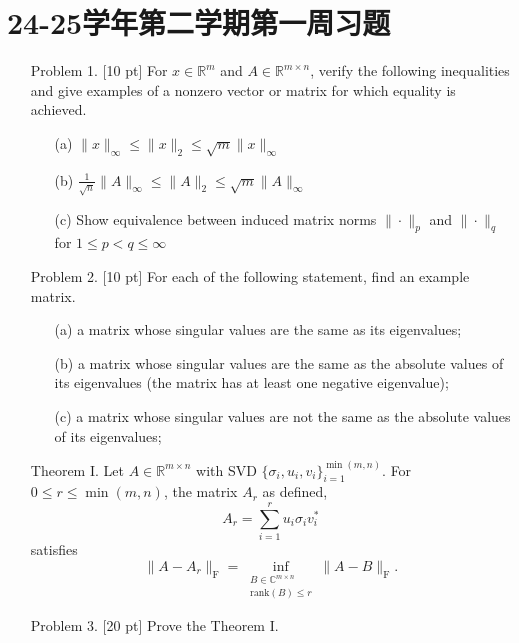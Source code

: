 \section{24-25学年第二学期第一周习题}
\begin{enumerate}[leftmargin=*]
  
\item[Problem 1.] [10 pt] For $x\in\mathbb{R}^{m}$ and $A\in\mathbb{R}^{m\times n}$, verify the following inequalities and give examples of a
nonzero vector or matrix for which equality is achieved.
\begin{enumerate}
\item[(a)] $\|x\|_{\infty} \leq \|x\|_2 \leq \sqrt{m}\|x\|_{\infty}$
\item[(b)] $\frac{1}{\sqrt{n}}\|A\|_{\infty} \leq \|A\|_2 \leq \sqrt{m}\|A\|_{\infty}$
\item[(c)] Show equivalence between induced matrix norms $\|\cdot\|_p$ and $\|\cdot\|_q$ for $1 \leq p < q \leq \infty$
\end{enumerate}

\item[Problem 2.] [10 pt] For each of the following statement, find an example matrix.
\begin{enumerate}
\item[(a)] a matrix whose singular values are the same as its eigenvalues;
\item[(b)] a matrix whose singular values are the same as the absolute values of its eigenvalues (the matrix has
at least one negative eigenvalue);
\item[(c)]  a matrix whose singular values are not the same as the absolute values of its eigenvalues;
\end{enumerate}

\item[Theorem I.] Let $A\in\mathbb{R}^{m\times n}$ with SVD $\{\sigma_i, u_i, v_i\}_{i=1}^{\min(m,n)}$. For $0 \leq r \leq \min(m,n)$,
the matrix $A_r$ as defined,$$A_r = \sum_{i=1}^r u_i\sigma_iv_i^*$$
satisfies
$$\|A - A_r\|_{\mathrm{F}} = \inf_{\substack{B\in\mathbb{C}^{m\times n} \\ \mathrm{rank}(B) \leq r}} \|A - B\|_{\mathrm{F}}.$$

\item[Problem 3.] [20 pt] Prove the Theorem I.


\end{enumerate}
